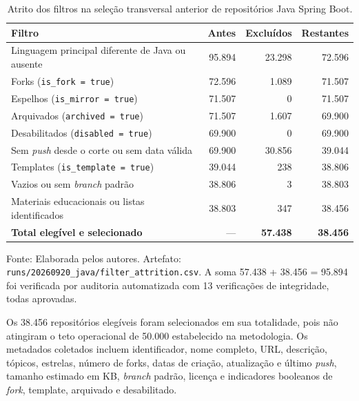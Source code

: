 \begin{table}[H]
    \centering
    \caption{Atrito dos filtros na seleção transversal anterior de repositórios Java Spring Boot.}
    \label{tab:atrito-filtros}
    \footnotesize
    \renewcommand{\arraystretch}{1.2}
    \begin{tabularx}{\linewidth}{|>{\raggedright\arraybackslash}X|r|r|r|}
        \hline
        \textbf{Filtro} & \textbf{Antes} & \textbf{Excluídos} & \textbf{Restantes} \\
        \hline
        Linguagem principal diferente de Java ou ausente & 95.894 & 23.298 & 72.596 \\
        \hline
        Forks (\texttt{is\_fork = true}) & 72.596 & 1.089 & 71.507 \\
        \hline
        Espelhos (\texttt{is\_mirror = true}) & 71.507 & 0 & 71.507 \\
        \hline
        Arquivados (\texttt{archived = true}) & 71.507 & 1.607 & 69.900 \\
        \hline
        Desabilitados (\texttt{disabled = true}) & 69.900 & 0 & 69.900 \\
        \hline
        Sem \emph{push} desde o corte ou sem data válida & 69.900 & 30.856 & 39.044 \\
        \hline
        Templates (\texttt{is\_template = true}) & 39.044 & 238 & 38.806 \\
        \hline
        Vazios ou sem \emph{branch} padrão & 38.806 & 3 & 38.803 \\
        \hline
        Materiais educacionais ou listas identificados & 38.803 & 347 & 38.456 \\
        \hline
        \textbf{Total elegível e selecionado} & --- & \textbf{57.438} & \textbf{38.456} \\
        \hline
    \end{tabularx}
    \vspace{4pt}
    {\footnotesize Fonte: Elaborada pelos autores. Artefato: \texttt{runs/20260920\_java/filter\_attrition.csv}. A soma 57.438 + 38.456 = 95.894 foi verificada por auditoria automatizada com 13 verificações de integridade, todas aprovadas.}
\end{table}

Os 38.456 repositórios elegíveis foram selecionados em sua totalidade, pois não atingiram o teto operacional de 50.000 estabelecido na metodologia. Os metadados coletados incluem identificador, nome completo, URL, descrição, tópicos, estrelas, número de forks, datas de criação, atualização e último \emph{push}, tamanho estimado em KB, \emph{branch} padrão, licença e indicadores booleanos de \emph{fork}, template, arquivado e desabilitado.

